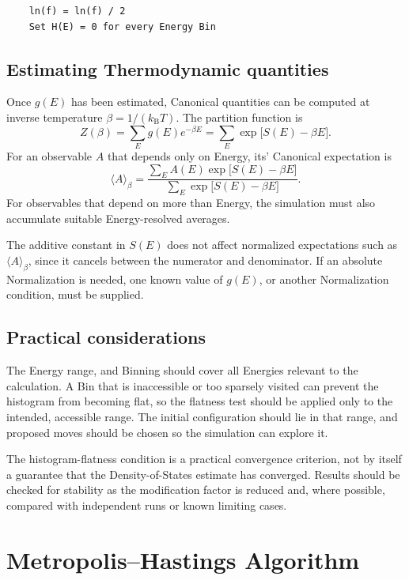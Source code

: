 \documentclass[a4paper, 10pt, onepage]{elegantbook}
\begin{document}
{\begin{verbatim}
    ln(f) = ln(f) / 2
    Set H(E) = 0 for every Energy Bin
\end{verbatim}

\subsection{Estimating Thermodynamic quantities}

Once \(g(E)\) has been estimated, Canonical quantities can be computed
at inverse temperature \(\beta=1/(k_{\mathrm B}T)\). The partition
function is
\[
  Z(\beta)
  =
  \sum_E g(E)e^{-\beta E}
  =
  \sum_E \exp\bigl[S(E)-\beta E\bigr].
\]
For an observable \(A\) that depends only on Energy, its' Canonical
expectation is
\[
  \langle A\rangle_\beta
  =
  \frac{\displaystyle\sum_E A(E)\exp\bigl[S(E)-\beta E\bigr]}
       {\displaystyle\sum_E \exp\bigl[S(E)-\beta E\bigr]}.
\]
For observables that depend on more than Energy, the simulation must
also accumulate suitable Energy-resolved averages.

The additive constant in \(S(E)\) does not affect normalized
expectations such as \(\langle A\rangle_\beta\), since it cancels between
the numerator and denominator. If an absolute Normalization is needed,
one known value of \(g(E)\), or another Normalization condition, must be
supplied.

\subsection{Practical considerations}

The Energy range, and Binning should cover all Energies relevant to the
calculation. A Bin that is inaccessible or too sparsely visited can
prevent the histogram from becoming flat, so the flatness test should
be applied only to the intended, accessible range. The initial
configuration should lie in that range, and proposed moves should be
chosen so the simulation can explore it.

The histogram-flatness condition is a practical convergence criterion,
not by itself a guarantee that the Density-of-States estimate has
converged. Results should be checked for stability as the modification
factor is reduced and, where possible, compared with independent runs
or known limiting cases.

\newpage

\section{Metropolis--Hastings Algorithm}

}
\end{document}
